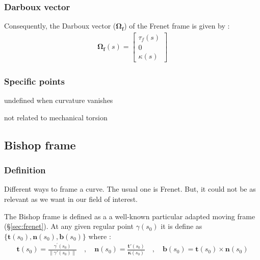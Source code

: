 \subsubsection{Darboux vector}
Consequently, the Darboux vector ($\mathbf{\Omega_{f}}$) of the Frenet frame is given by :
\begin{gather}
\mathbf{\Omega_f}(s) 
= 
\left[\begin{array}{c}
\tau_{f}(s) \\
0 \\
\kappa(s)
\end{array}\right]
\end{gather}

\subsubsection{Specific points}
undefined when curvature vanishes

not related to mechanical torsion


\subsection{Bishop frame}

\subsubsection{Definition}
Different ways to frame a curve. The usual one is Frenet. But, it could not be as relevant as we want in our field of interest.

The Bishop frame is defined as a a well-known particular adapted moving frame (§\ref{sec:frenet}). At any given regular point $\gamma(s_0)$ it is define as $\{\mathbf{t}(s_0),\mathbf{n}(s_0),\mathbf{b}(s_0)\}$ where : 
\begin{gather}
\mathbf{t}(s_0) = \frac{\gamma^{'}(s_0)}{\|\gamma'(s_0)\|}
\quad,\quad
\mathbf{n}(s_0) = \frac{\mathbf{t'}(s_0)}{\mathbf{\kappa}(s_0)}
\quad,\quad
\mathbf{b}(s_0)= \mathbf{t}(s_0)\times\mathbf{n}(s_0)
\end{gather}


